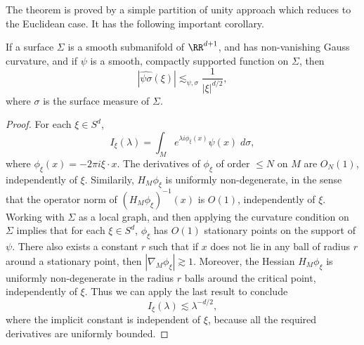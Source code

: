 The theorem is proved by a simple partition of unity approach which reduces to the Euclidean case. It has the following important corollary.

\begin{theorem}
  If a surface $\Sigma$ is a smooth submanifold of $\RR^{d+1}$, and has non-vanishing Gauss curvature, and if $\psi$ is a smooth, compactly supported function on $\Sigma$, then
    \[ |\widehat{\psi \sigma}(\xi)| \lesssim_{\psi,\sigma} \frac{1}{|\xi|^{d/2}}, \]
    where $\sigma$ is the surface measure of $\Sigma$.
\end{theorem}
\begin{proof}
  For each $\xi \in S^d$,
  \[ I_\xi(\lambda) = \int_M e^{\lambda i \phi_\xi(x)} \psi(x)\; d\sigma, \]
  where $\phi_\xi(x) = -2 \pi i \xi \cdot x$. The derivatives of $\phi_\xi$ of order $\leq N$ on $M$ are $O_N(1)$, independently of $\xi$. Similarily, $H_M \phi_\xi$ is uniformly non-degenerate, in the sense that the operator norm of $(H_M \phi_\xi)^{-1}(x)$ is $O(1)$, independently of $\xi$. Working with $\Sigma$ as a local graph, and then applying the curvature condition on $\Sigma$ implies that for each $\xi \in S^d$, $\phi_\xi$ has $O(1)$ stationary points on the support of $\psi$. There also exists a constant $r$ such that if $x$ does not lie in any ball of radius $r$ around a stationary point, then $|\nabla_M \phi_\xi| \gtrsim 1$. Moreover, the Hessian $H_M \phi_\xi$ is uniformly non-degenerate in the radius $r$ balls around the critical point, independently of $\xi$. Thus we can apply the last result to conclude
  \[ I_\xi(\lambda) \lesssim \lambda^{-d/2}, \]
  where the implicit constant is independent of $\xi$, because all the required derivatives are uniformly bounded.
\begin{comment}


\end{comment}
\end{proof}

